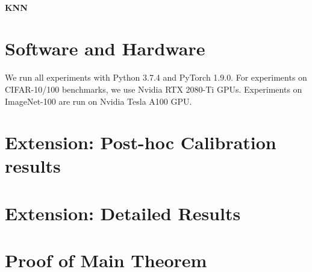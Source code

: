 \paragraph{KNN~\cite{sun2022knn}}

\section{Software and Hardware}
\label{app:hardware}
We run all experiments with Python 3.7.4 and PyTorch 1.9.0. For experiments on CIFAR-10/100 benchmarks, we use Nvidia RTX 2080-Ti GPUs. Experiments on ImageNet-100 are run on Nvidia Tesla A100 GPU. 



\section{Extension: Post-hoc Calibration results}
\label{app:post_hoc_calib}





\section{Extension: Detailed Results}
\label{app:results}


\section{Proof of Main Theorem}
\label{app:proof}

